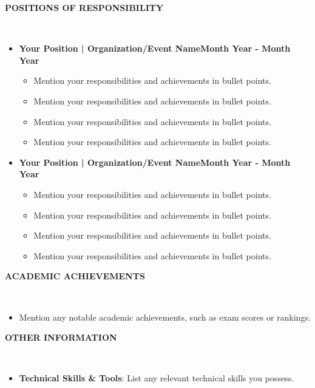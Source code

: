 \documentclass[11pt,article]{article}
\newcommand{\resheading}[1]{{\small \colorbox{mygrey} { \begin{minipage}{0.99\textwidth}{\textbf{#1 \vphantom{p\^{E}}}}\end{minipage}}}}
\begin{document}
\noindent
\resheading{\textbf{POSITIONS OF RESPONSIBILITY} }\\[-0.35cm]
\vspace{-0.4em}
\begin{itemize}
\setlength\itemsep{-0.28em}
\item \textbf{Your Position | Organization/Event Name}\hfill \textbf{Month Year - Month Year}
\vspace{-0.25em}
\begin{itemize} [noitemsep,topsep=0pt]
    \item Mention your responsibilities and achievements in bullet points.
    \item Mention your responsibilities and achievements in bullet points.
    \item Mention your responsibilities and achievements in bullet points.
    \item Mention your responsibilities and achievements in bullet points.
\end{itemize}
\vspace{0.5em}
\item \textbf{Your Position | Organization/Event Name}\hfill \textbf{Month Year - Month Year}
\vspace{-0.25em}
\begin{itemize} [noitemsep,topsep=0pt]
    \item Mention your responsibilities and achievements in bullet points.
    \item Mention your responsibilities and achievements in bullet points.
    \item Mention your responsibilities and achievements in bullet points.
    \item Mention your responsibilities and achievements in bullet points.
\end{itemize}
\vspace{0.5em}
\end{itemize}

\noindent
\resheading{\textbf{ACADEMIC ACHIEVEMENTS}}\\[-0.35cm]
\vspace{-0.4em}
\begin{itemize}[itemsep=1pt]
\item Mention any notable academic achievements, such as exam scores or rankings.
\end{itemize}

\noindent
\resheading{\textbf{OTHER INFORMATION}}\\[-0.35cm]
 \begin{itemize}
  \item \textbf{Technical Skills \& Tools}: List any relevant technical skills you possess. \\[-0.6cm]
\end{itemize}
\end{document}
